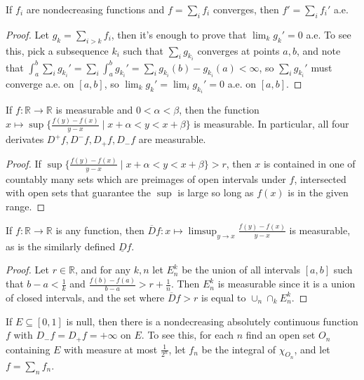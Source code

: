 \begin{prop} If $f_i$ are nondecreasing functions and $f = \sum_i f_i$ converges, then $f' = \sum_i f_i'$ a.e.
\end{prop}
\begin{proof} Let $g_k = \sum_{i>k} f_i$, then it's enough to prove that $\lim_k g_k' = 0$ a.e. To see this, pick a subsequence $k_i$ such that $\sum_i g_{k_i}$ converges at points $a,b$, and note that $\int_a^b \sum_i g_{k_i}' = \sum_i \int_a^b g_{k_i}' = \sum_i g_{k_i}(b) - g_{k_i}(a) < \infty$, so $\sum_i g_{k_i}'$ must converge a.e. on $[a,b]$, so $\lim_k g_k' = \lim_i g_{k_i}' = 0$ a.e. on $[a,b]$.
\end{proof}

\begin{prop} If $f : \mathbb{R} \rightarrow \mathbb{R}$ is measurable and $0 < \alpha < \beta$, then the function $x \mapsto \sup\{\frac{f(y)-f(x)}{y-x} \mid x+\alpha < y < x+\beta\}$ is measurable. In particular, all four derivates $D^+f, D^-f, D_+f, D_-f$ are measurable.
\end{prop}
\begin{proof} If $\sup\{\frac{f(y)-f(x)}{y-x} \mid x+\alpha < y < x+\beta\} > r$, then $x$ is contained in one of countably many sets which are preimages of open intervals under $f$, intersected with open sets that guarantee the $\sup$ is large so long as $f(x)$ is in the given range.
\end{proof}

\begin{prop} If $f : \mathbb{R} \rightarrow \mathbb{R}$ is any function, then $\overline{D}f : x \mapsto \limsup_{y\rightarrow x} \frac{f(y)-f(x)}{y-x}$ is measurable, as is the similarly defined $\underline{D}f$.
\end{prop}
\begin{proof} Let $r \in \mathbb{R}$, and for any $k,n$ let $E^k_n$ be the union of all intervals $[a,b]$ such that $b-a < \frac{1}{k}$ and $\frac{f(b)-f(a)}{b-a} > r+\frac{1}{n}$. Then $E^k_n$ is measurable since it is a union of closed intervals, and the set where $\overline{D}f > r$ is equal to $\cup_n \cap_k E^k_n$.
\end{proof}

\begin{ex} If $E \subseteq [0,1]$ is null, then there is a nondecreasing absolutely continuous function $f$ with $D_-f = D_+f = +\infty$ on $E$. To see this, for each $n$ find an open set $O_n$ containing $E$ with measure at most $\frac{1}{2^n}$, let $f_n$ be the integral of $\chi_{O_n}$, and let $f = \sum_n f_n$.
\end{ex}

